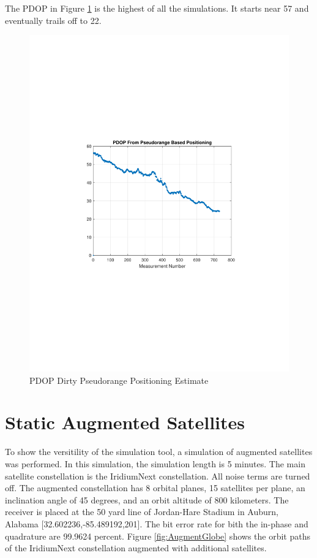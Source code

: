 \documentclass[12pt]{report}
\begin{document}
The PDOP in Figure \ref{fig:PDOPDirtyPseudorange15minIridPosit} is the highest of all the simulations. It starts near 57 and eventually trails off to 22.
\begin{figure}[h!]
    \centering
    \includegraphics[trim=1.2in 3.3in 1.75in 3.3in,clip,width=5in]
    {Irid_15min_noisy_PDOPpseudo.pdf}
    \caption{PDOP Dirty Pseudorange Positioning Estimate}
    \label{fig:PDOPDirtyPseudorange15minIridPosit}
\end{figure}


\section{Static Augmented Satellites}
To show the versitility of the simulation tool, a simulation of augmented satellites was performed. In this simulation, the simulation length is 5 minutes. The main satellite constellation is the IridiumNext constellation. All noise terms are turned off. The augmented constellation has 8 orbital planes, 15 satellites per plane, an inclination angle of 45 degrees, and an orbit altitude of 800 kilometers. The receiver is placed at the 50 yard line of Jordan-Hare Stadium in Auburn, Alabama [32.602236,-85.489192,201]. The bit error rate for bith the in-phase and quadrature are 99.9624 percent. Figure \ref{fig:AugmentGlobe} shows the orbit paths of the IridiumNext constellation augmented with additional satellites. 
\end{document}

